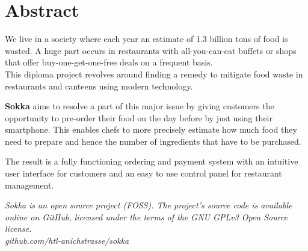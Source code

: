 \section*{Abstract}

We live in a society where each year an estimate of 1.3 billion tons of food is wasted. A huge part occurs in restaurants with all-you-can-eat buffets or shops that offer buy-one-get-one-free deals on a frequent basis. \cite{depta2018}\\This diploma project revolves around finding a remedy to mitigate food waste in restaurants and canteens using modern technology.

\textbf{Sokka} aims to resolve a part of this major issue by giving customers the opportunity to pre-order their food on the day before by just using their smartphone. This enables chefs to more precisely estimate how much food they need to prepare and hence the number of ingredients that have to be purchased.

The result is a fully functioning ordering and payment system with an intuitive user interface for customers and an easy to use control panel for restaurant management.

\textit{Sokka is an open source project (FOSS). The project's source code is available online on GitHub, licensed under the terms of the GNU GPLv3 Open Source license.\\github.com/htl-anichstrasse/sokka}

\newpage